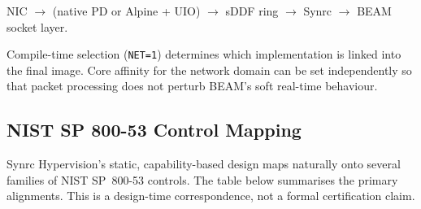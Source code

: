 \documentclass{article}
\begin{document}
\begin{center}
NIC $\to$ (native PD or Alpine + UIO) $\to$ sDDF ring $\to$ Synrc $\to$ BEAM socket layer.
\end{center}

Compile-time selection (\texttt{NET=1}) determines which implementation is linked into the final image.
Core affinity for the network domain can be set independently so that packet processing does
not perturb BEAM’s soft real-time behaviour.

\newpage
\subsection{NIST SP 800-53 Control Mapping}
\label{sec:nist}

Synrc Hypervision’s static, capability-based design maps naturally onto several families of NIST SP~800-53 controls. The table below summarises the primary alignments. This is a design-time correspondence, not a formal certification claim.
\end{document}

